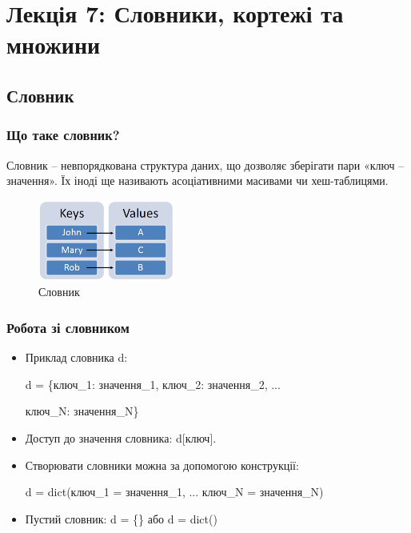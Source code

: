 \section*{Лекція 7: Словники, кортежі та множини}
 
\subsection{Словник} 
\begin{frame}
\frametitle{Що таке словник?}
Словник – невпорядкована структура даних, що дозволяє зберігати пари «ключ – значення». Їх іноді ще називають асоціативними масивами чи хеш-таблицями.

\begin{figure}
\begin{center}
 \includegraphics[width=0.4\textwidth]{pictures/dict.png}
\caption{Словник}
\label{dict} 
\end{center}
\end{figure}

\end{frame}

\begin{frame}
\frametitle{Робота зі словником}

\begin{itemize}
  \item 
  Приклад словника d:

 d = \{ключ\_1: значення\_1,
   ключ\_2: значення\_2, ... 

ключ\_N: значення\_N\}
\item Доступ до значення словника: d[ключ].

\item
Створювати словники можна за допомогою конструкції:

d = dict(ключ\_1 = значення\_1, ...
 ключ\_N = значення\_N)
 
 \item Пустий словник: d = \{\} або d = dict()
\end{itemize}

\end{frame}

